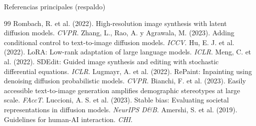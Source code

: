 \documentclass[aspectratio=169,11pt]{beamer}
\begin{document}
\begin{frame}[allowframebreaks]{Referencias principales (respaldo)}
  \footnotesize
  \begin{thebibliography}{99}
     Rombach, R. et al. (2022). High-resolution image synthesis with latent diffusion models. \emph{CVPR}.
     Zhang, L., Rao, A. y Agrawala, M. (2023). Adding conditional control to text-to-image diffusion models. \emph{ICCV}.
     Hu, E. J. et al. (2022). LoRA: Low-rank adaptation of large language models. \emph{ICLR}.
     Meng, C. et al. (2022). SDEdit: Guided image synthesis and editing with stochastic differential equations. \emph{ICLR}.
     Lugmayr, A. et al. (2022). RePaint: Inpainting using denoising diffusion probabilistic models. \emph{CVPR}.
     Bianchi, F. et al. (2023). Easily accessible text-to-image generation amplifies demographic stereotypes at large scale. \emph{FAccT}.
     Luccioni, A. S. et al. (2023). Stable bias: Evaluating societal representations in diffusion models. \emph{NeurIPS D\&B}.
     Amershi, S. et al. (2019). Guidelines for human-AI interaction. \emph{CHI}.
  \end{thebibliography}
\end{frame}
\end{document}
